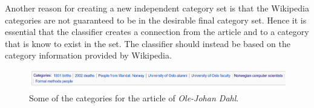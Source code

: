 Another reason for creating a new independent category set is that the Wikipedia categories are not guaranteed to be in the desirable final category set. Hence it is essential that the classifier creates a connection from the article and to a category that is know to exist in the set. The classifier should instead be based on the category information provided by Wikipedia. 



\begin{figure}[H]
\centering
\includegraphics[width=\textwidth]{Dumps/imgs/olejohandahl-categories.png}
\caption[Categories for an Wikipedia article]{Some of the categories for the article of \emph{Ole-Johan Dahl}.}
\label{fig: olejohandahl_categories}
\end{figure}


